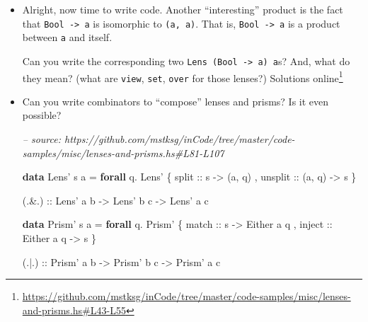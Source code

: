 \documentclass[]{article}
\newenvironment{Shaded}{}{}
\newcommand{\CommentTok}[1]{\textcolor[rgb]{0.38,0.63,0.69}{\textit{#1}}}
\newcommand{\DataTypeTok}[1]{\textcolor[rgb]{0.56,0.13,0.00}{#1}}
\newcommand{\FunctionTok}[1]{\textcolor[rgb]{0.02,0.16,0.49}{#1}}
\newcommand{\KeywordTok}[1]{\textcolor[rgb]{0.00,0.44,0.13}{\textbf{#1}}}
\newcommand{\NormalTok}[1]{#1}
\newcommand{\OtherTok}[1]{\textcolor[rgb]{0.00,0.44,0.13}{#1}}
\renewcommand{\href}[2]{#2\footnote{\url{#1}}}
\begin{document}
\begin{itemize}
\begin{Shaded}
\begin{Highlighting}[]
\OtherTok{mysteryPrism1 ::} \DataTypeTok{Prism'}\NormalTok{ (}\DataTypeTok{Bool}\NormalTok{, a) a}

\OtherTok{mysteryPrism2 ::} \DataTypeTok{Prism'}\NormalTok{ (}\DataTypeTok{Bool}\NormalTok{, a) a}
\end{Highlighting}
\end{Shaded}

  What do these prisms do? What is \texttt{preview}, \texttt{review},
  \texttt{over} for them?
\item
  Alright, now time to write code. Another ``interesting'' product is the fact
  that \texttt{Bool\ -\textgreater{}\ a} is isomorphic to \texttt{(a,\ a)}. That
  is, \texttt{Bool\ -\textgreater{}\ a} is a product between \texttt{a} and
  itself.

  Can you write the corresponding two
  \texttt{Lens\textquotesingle{}\ (Bool\ -\textgreater{}\ a)\ a}s? And, what do
  they mean? (what are \texttt{view}, \texttt{set}, \texttt{over} for those
  lenses?)
  \href{https://github.com/mstksg/inCode/tree/master/code-samples/misc/lenses-and-prisms.hs\#L43-L55}{Solutions
  online}
\item
  Can you write combinators to ``compose'' lenses and prisms? Is it even
  possible?

\begin{Shaded}
\begin{Highlighting}[]
\CommentTok{-- source: https://github.com/mstksg/inCode/tree/master/code-samples/misc/lenses-and-prisms.hs#L81-L107}

\KeywordTok{data} \DataTypeTok{Lens'}\NormalTok{ s a }\FunctionTok{=} \KeywordTok{forall}\NormalTok{ q}\FunctionTok{.} \DataTypeTok{Lens'}
\NormalTok{    \{}\OtherTok{ split   ::}\NormalTok{ s }\OtherTok{->}\NormalTok{ (a, q)}
\NormalTok{    ,}\OtherTok{ unsplit ::}\NormalTok{ (a, q) }\OtherTok{->}\NormalTok{ s}
\NormalTok{    \}}

\OtherTok{(.&.) ::} \DataTypeTok{Lens'}\NormalTok{ a b}
      \OtherTok{->} \DataTypeTok{Lens'}\NormalTok{ b c}
      \OtherTok{->} \DataTypeTok{Lens'}\NormalTok{ a c}

\KeywordTok{data} \DataTypeTok{Prism'}\NormalTok{ s a }\FunctionTok{=} \KeywordTok{forall}\NormalTok{ q}\FunctionTok{.} \DataTypeTok{Prism'}
\NormalTok{    \{}\OtherTok{ match  ::}\NormalTok{ s }\OtherTok{->} \DataTypeTok{Either}\NormalTok{ a q}
\NormalTok{    ,}\OtherTok{ inject ::} \DataTypeTok{Either}\NormalTok{ a q }\OtherTok{->}\NormalTok{ s}
\NormalTok{    \}}

\OtherTok{(.|.) ::} \DataTypeTok{Prism'}\NormalTok{ a b}
      \OtherTok{->} \DataTypeTok{Prism'}\NormalTok{ b c}
      \OtherTok{->} \DataTypeTok{Prism'}\NormalTok{ a c}
\end{Highlighting}
\end{Shaded}


\end{itemize}
\end{document}
